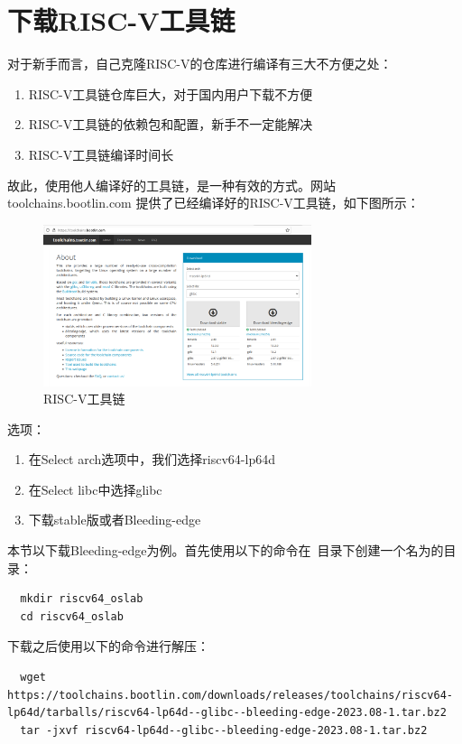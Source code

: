 \documentclass[lang=cn,10pt]{elegantbook}
\begin{document}
\section{下载RISC-V工具链}
对于新手而言，自己克隆RISC-V的仓库进行编译有三大不方便之处：

\begin{enumerate}
  \item RISC-V工具链仓库巨大，对于国内用户下载不方便
  \item RISC-V工具链的依赖包和配置，新手不一定能解决
  \item RISC-V工具链编译时间长
\end{enumerate}

故此，使用他人编译好的工具链，是一种有效的方式。网站 toolchains.bootlin.com 提供了已经编译好的RISC-V工具链，如下图所示：

\begin{figure}[htbp]
  \centering
  \includegraphics[width=0.7\textwidth]{image/image-20231105091522260.png}
  \caption{RISC-V工具链}
\end{figure}

选项：
\begin{enumerate}

\item 在Select arch选项中，我们选择riscv64-lp64d
\item 在Select libc中选择glibc
\item 下载stable版或者Bleeding-edge
  
\end{enumerate}

本节以下载Bleeding-edge为例。首先使用以下的命令在~目录下创建一个名为的目录：

\begin{lstlisting}
  mkdir riscv64_oslab
  cd riscv64_oslab
\end{lstlisting}

下载之后使用以下的命令进行解压：

\begin{lstlisting}
  wget https://toolchains.bootlin.com/downloads/releases/toolchains/riscv64-lp64d/tarballs/riscv64-lp64d--glibc--bleeding-edge-2023.08-1.tar.bz2
  tar -jxvf riscv64-lp64d--glibc--bleeding-edge-2023.08-1.tar.bz2  
\end{lstlisting}
\end{document}
